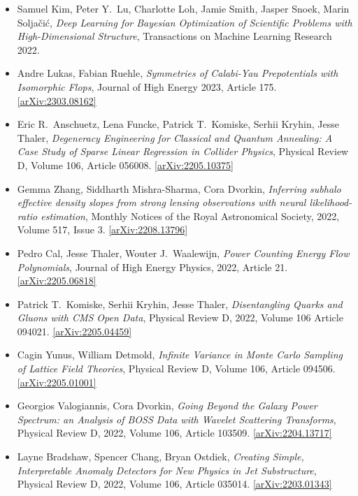 \begin{itemize}
\item Samuel Kim, Peter Y.\  Lu, Charlotte Loh, Jamie Smith, Jasper Snoek, Marin Soljačić, \textit{Deep Learning for Bayesian Optimization of Scientific Problems with High-Dimensional Structure}, Transactions on Machine Learning Research 2022. 
\item Andre Lukas, Fabian Ruehle, \textit{Symmetries of Calabi-Yau Prepotentials with Isomorphic Flops}, Journal of High Energy 2023, Article 175. \href{https://arxiv.org/abs/2303.08162}{[arXiv:2303.08162]} 
\item Eric R.\  Anschuetz, Lena Funcke, Patrick T.\  Komiske, Serhii Kryhin, Jesse Thaler, \textit{Degeneracy Engineering for Classical and Quantum Annealing: A Case Study of Sparse Linear Regression in Collider Physics}, Physical Review D, Volume 106, Article 056008. \href{https://arxiv.org/abs/2205.10375}{[arXiv:2205.10375]} 
\item Gemma Zhang, Siddharth Mishra-Sharma, Cora Dvorkin, \textit{Inferring subhalo effective density slopes from strong lensing observations with neural likelihood-ratio estimation}, Monthly Notices of the Royal Astronomical Society, 2022, Volume 517, Issue 3. \href{https://arxiv.org/abs/2208.13796}{[arXiv:2208.13796]} 
\item Pedro Cal, Jesse Thaler, Wouter J.\  Waalewijn, \textit{Power Counting Energy Flow Polynomials}, Journal of High Energy Physics, 2022, Article 21. \href{https://arxiv.org/abs/2205.06818}{[arXiv:2205.06818]} 
\item Patrick T.\  Komiske, Serhii Kryhin, Jesse Thaler, \textit{Disentangling Quarks and Gluons with CMS Open Data}, Physical Review D, 2022, Volume 106 Article 094021. \href{https://arxiv.org/abs/2205.04459}{[arXiv:2205.04459]} 
\item Cagin Yunus, William Detmold, \textit{Infinite Variance in Monte Carlo Sampling of Lattice Field Theories}, Physical Review D, Volume 106, Article 094506. \href{https://arxiv.org/abs/2205.01001}{[arXiv:2205.01001]} 
\item Georgios Valogiannis, Cora Dvorkin, \textit{Going Beyond the Galaxy Power Spectrum: an Analysis of BOSS Data with Wavelet Scattering Transforms}, Physical Review D, 2022, Volume 106, Article 103509. \href{https://arxiv.org/abs/2204.13717}{[arXiv:2204.13717]} 
\item Layne Bradshaw, Spencer Chang, Bryan Ostdiek, \textit{Creating Simple, Interpretable Anomaly Detectors for New Physics in Jet Substructure}, Physical Review D, 2022, Volume 106, Article 035014. \href{https://arxiv.org/abs/2203.01343}{[arXiv:2203.01343]} 

\end{itemize}
